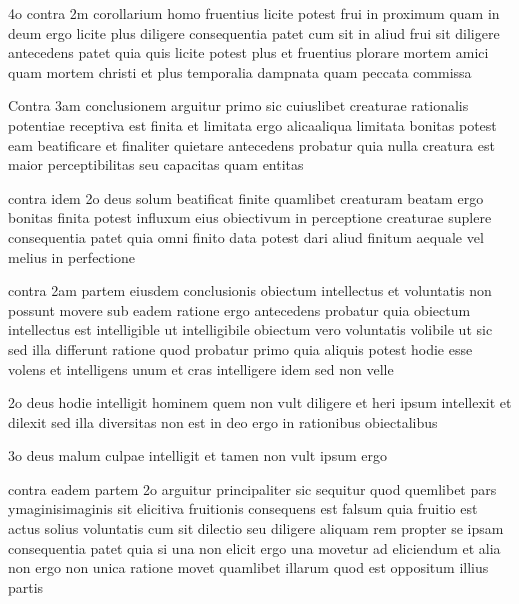 \documentclass[twoside, openright]{article}
\begin{document}
        \pstart
        4o contra 2m corollarium homo fruentius licite potest frui in proximum quam in deum ergo licite plus diligere consequentia patet cum sit in aliud frui sit diligere antecedens patet quia quis licite potest plus et fruentius plorare mortem amici quam mortem christi et plus temporalia dampnata quam peccata commissa 
        \pend
     
        \pstart
        Contra 3am conclusionem arguitur primo sic cuiuslibet creaturae rationalis potentiae receptiva est finita et limitata ergo alicaaliqua limitata bonitas potest eam beatificare et finaliter quietare antecedens probatur quia nulla creatura est maior perceptibilitas seu capacitas quam entitas
        \pend
     
        \pstart
        contra idem 2o deus solum beatificat finite quamlibet creaturam beatam ergo bonitas finita potest influxum eius obiectivum in perceptione creaturae suplere consequentia patet quia omni finito data potest dari aliud finitum aequale vel melius in perfectione
        \pend
     
        \pstart
        contra 2am partem eiusdem conclusionis obiectum intellectus et voluntatis non possunt  movere sub eadem ratione ergo antecedens probatur quia obiectum intellectus est intelligible ut intelligibile obiectum vero voluntatis volibile ut sic sed illa differunt ratione quod probatur primo quia aliquis potest hodie esse volens et intelligens unum et cras intelligere idem sed non velle
        \pend
     
        \pstart
        2o deus hodie intelligit hominem quem non vult diligere et heri ipsum intellexit et dilexit sed illa diversitas non est in deo ergo in rationibus obiectalibus
        \pend
     
        \pstart
        3o deus malum culpae intelligit et tamen non vult ipsum ergo
        \pend
     
        \pstart
        contra eadem partem 2o arguitur principaliter sic sequitur quod quemlibet pars ymaginisimaginis sit elicitiva fruitionis consequens est falsum quia fruitio est actus solius voluntatis cum sit dilectio seu diligere aliquam rem propter se ipsam consequentia patet quia si una non elicit ergo una movetur ad eliciendum et alia non ergo non unica ratione movet quamlibet illarum quod est oppositum illius partis
        \pend
     
\end{document}

